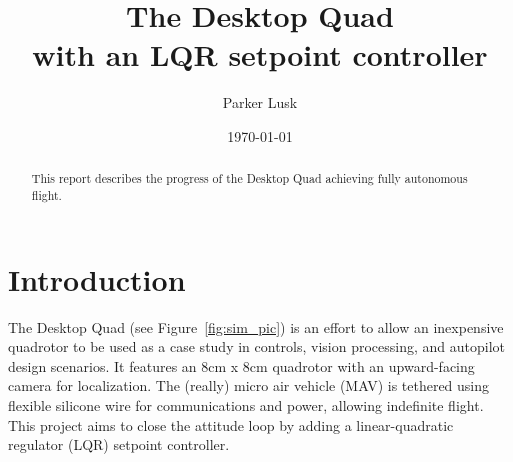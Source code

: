 \documentclass[12pt]{article}
\begin{document}
\title{\LARGE The Desktop Quad \\ \large with an LQR setpoint controller }
\author{Parker Lusk}
\date{\today}
\maketitle

\begin{abstract}
	This report describes the progress of the Desktop Quad achieving fully autonomous flight.
\end{abstract}

\doublespacing
\section{Introduction}
The Desktop Quad (see Figure~\ref{fig:sim_pic}) is an effort to allow an inexpensive quadrotor to be used as a case study in controls, vision processing, and autopilot design scenarios. It features an 8cm x 8cm quadrotor with an upward-facing camera for localization. The (really) micro air vehicle (MAV) is tethered using flexible silicone wire for communications and power, allowing indefinite flight. This project aims to close the attitude loop by adding a linear-quadratic regulator (LQR) setpoint controller.
\end{document}
